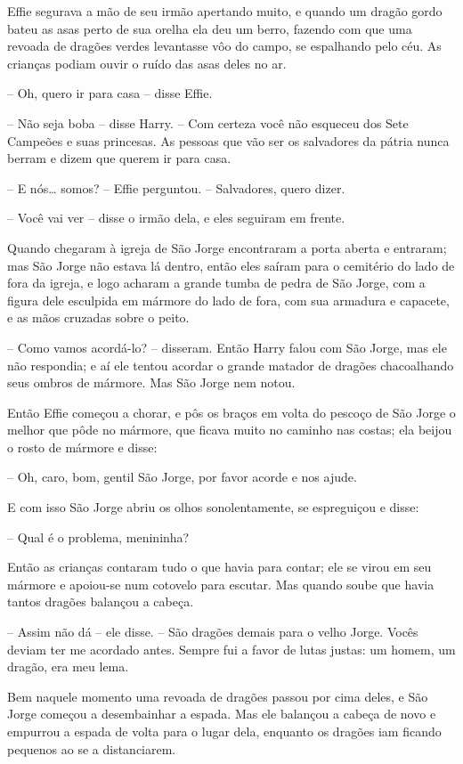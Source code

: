Effie segurava a mão de seu irmão apertando muito, e quando um dragão
gordo bateu as asas perto de sua orelha ela deu um berro, fazendo com
que uma revoada de dragões verdes levantasse vôo do campo, se
espalhando pelo céu. As crianças podiam ouvir o ruído das asas deles
no ar.

-- Oh, quero ir para casa -- disse Effie.

-- Não seja boba -- disse Harry. -- Com certeza você não esqueceu dos
Sete Campeões e suas princesas. As pessoas que vão ser os salvadores
da pátria nunca berram e dizem que querem ir para casa. 

-- E nós… somos? -- Effie perguntou. -- Salvadores, quero dizer.

-- Você vai ver -- disse o irmão dela, e eles seguiram em frente.

Quando chegaram à igreja de São Jorge encontraram a porta aberta e
entraram; mas São Jorge não estava lá dentro, então eles saíram para
o cemitério do lado de fora da igreja, e logo acharam a grande tumba
de pedra de São Jorge, com a figura dele esculpida em mármore do lado
de fora, com sua armadura e capacete, e as mãos cruzadas sobre o
peito.

-- Como vamos acordá-lo? -- disseram. Então Harry falou com São Jorge,
mas ele não respondia; e aí ele tentou acordar o grande matador de
dragões chacoalhando seus ombros de mármore. Mas São Jorge nem notou.

Então Effie começou a chorar, e pôs os braços em volta do pescoço de
São Jorge o melhor que pôde no mármore, que ficava muito no caminho
nas costas; ela beijou o rosto de mármore e disse:

-- Oh, caro, bom, gentil São Jorge, por favor acorde e nos ajude.

E com isso São Jorge abriu os olhos sonolentamente, se espreguiçou e
disse:

-- Qual é o problema, menininha?

Então as crianças contaram tudo o que havia para contar; ele se virou
em seu mármore e apoiou-se num cotovelo para escutar. Mas quando
soube que havia tantos dragões balançou a cabeça.

-- Assim não dá -- ele disse. -- São dragões demais para o velho Jorge.
Vocês deviam ter me acordado antes. Sempre fui a favor de lutas
justas: um homem, um dragão, era meu lema.

Bem naquele momento uma revoada de dragões passou por cima deles, e
São Jorge começou a desembainhar a espada. Mas ele balançou a cabeça
de novo e empurrou a espada de volta para o lugar dela, enquanto os
dragões iam ficando pequenos ao se a distanciarem.

